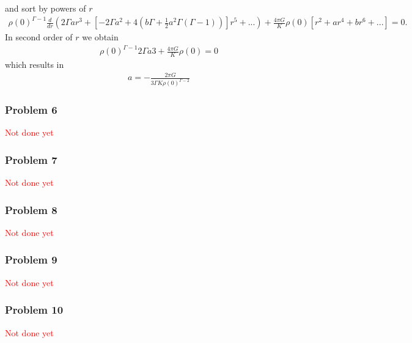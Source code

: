 \documentclass[10pt,a4paper]{article}
\theoremstyle{definition}
\begin{document}
and sort by powers of $r$
\begin{align}
    \rho(0)^{\Gamma-1}\frac{d}{dr}\left(2\Gamma ar^3+\left[-2\Gamma a^2+4\left(b\Gamma+\frac{1}{2}a^2\Gamma(\Gamma-1)\right)\right]r^5+...\right)+\frac{4\pi G}{K}\rho(0)\left[r^2+ar^4+br^6+...\right]=0.
\end{align}
In second order of $r$ we obtain
\begin{align}
    \rho(0)^{\Gamma-1}2\Gamma a3+\frac{4\pi G}{K}\rho(0)=0
\end{align}
which results in
\begin{align}
     a=-\frac{2\pi G}{3\Gamma K\rho(0)^{\Gamma-2}}
\end{align}

\subsubsection{Problem 6}
\textcolor{red}{Not done yet}

\subsubsection{Problem 7}
\textcolor{red}{Not done yet}
\subsubsection{Problem 8}
\textcolor{red}{Not done yet}
\subsubsection{Problem 9}
\textcolor{red}{Not done yet}
\subsubsection{Problem 10}
\textcolor{red}{Not done yet}
\end{document}

